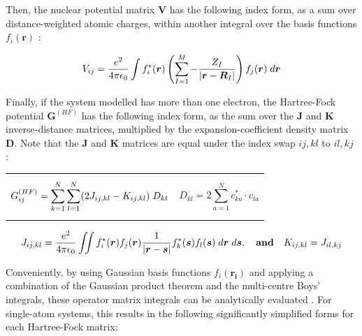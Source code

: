 Then, the nuclear potential matrix $\boldsymbol{V}$ has the following index form, as a sum over distance-weighted atomic charges, within another integral over the basis functions $f_i(\boldsymbol{r})$ \cite{quiney_art_nodate}:

\begin{equation}\label{eq:HartreeFockV}
V_{ij}=\frac{e^2}{4\pi\epsilon_0}\int f_i^*(\boldsymbol{r})\left( \sum_{I=1}^{M}-\frac{Z_I}{\left| \boldsymbol{r}-\boldsymbol{R}_I \right|} \right)f_j(\boldsymbol{r})\thickspace d\boldsymbol{r}
\end{equation}

Finally, if the system modelled has more than one electron, the Hartree-Fock potential $\boldsymbol{G}^{(HF)}$ has the following index form, as the sum over the $\boldsymbol{J}$ and $\boldsymbol{K}$ inverse-distance matrices, multiplied by the expansion-coefficient density matrix $\boldsymbol{D}$. Note that the $\boldsymbol{J}$ and $\boldsymbol{K}$ matrices are equal under the index swap $ij,kl$ to $il,kj$ \cite{quiney_art_nodate}:

\vspace{-0.7cm}
\begin{center}
\begin{tabular}{p{10cm}p{6.4cm}}

\begin{equation}\label{eq:HartreeFockG}
G_{ij}^{(HF)}=\sum_{k=1}^{N}\sum_{l=1}^{N}(2J_{ij,kl}-K_{ij,kl})\thickspace D_{kl}
\end{equation}

&

\begin{equation}\label{eq:HartreeFockD}
D_{kl}=2\sum_{a=1}^{N}c_{ka}^*\cdot c_{la}
\end{equation}

\end{tabular}
\end{center}


\begin{equation}\label{eq:HartreeFockJ}
J_{ij,kl}=\frac{e^2}{4\pi\epsilon_0}\iint f_i^*(\boldsymbol{r})f_{j}(\boldsymbol{r}) \frac{1}{\left| \boldsymbol{r}-\boldsymbol{s} \right|} f_{k}^*(\boldsymbol{s})f_{l}(\boldsymbol{s})\thickspace d\boldsymbol{r} \thickspace d\boldsymbol{s}, \quad \textbf{and} \quad K_{ij,kl}=J_{il,kj}
\end{equation}


Conveniently, by using Gaussian basis functions $f_i(\boldsymbol{r_i})$ and applying a combination of the Gaussian product theorem and the multi-centre Boys' integrals, these operator matrix integrals can be analytically evaluated \cite{quiney_art_nodate}. For single-atom systems, this results in the following significantly simplified forms for each Hartree-Fock matrix:

